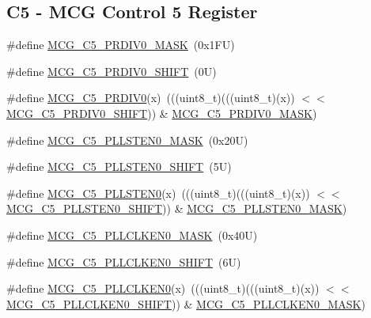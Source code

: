 \subsection*{C5 -\/ M\+CG Control 5 Register}
\begin{DoxyCompactItemize}
\item 
\#define \mbox{\hyperlink{group___m_c_g___register___masks_ga28ab0b9007f9941707395660db088172}{M\+C\+G\+\_\+\+C5\+\_\+\+P\+R\+D\+I\+V0\+\_\+\+M\+A\+SK}}~(0x1\+F\+U)
\item 
\#define \mbox{\hyperlink{group___m_c_g___register___masks_ga452026beec3bec5a580d151e15d83f30}{M\+C\+G\+\_\+\+C5\+\_\+\+P\+R\+D\+I\+V0\+\_\+\+S\+H\+I\+FT}}~(0\+U)
\item 
\#define \mbox{\hyperlink{group___m_c_g___register___masks_gaff29a787086eaba9ef46f4e873d83a54}{M\+C\+G\+\_\+\+C5\+\_\+\+P\+R\+D\+I\+V0}}(x)~(((uint8\+\_\+t)(((uint8\+\_\+t)(x)) $<$$<$ \mbox{\hyperlink{group___m_c_g___register___masks_ga452026beec3bec5a580d151e15d83f30}{M\+C\+G\+\_\+\+C5\+\_\+\+P\+R\+D\+I\+V0\+\_\+\+S\+H\+I\+FT}})) \& \mbox{\hyperlink{group___m_c_g___register___masks_ga28ab0b9007f9941707395660db088172}{M\+C\+G\+\_\+\+C5\+\_\+\+P\+R\+D\+I\+V0\+\_\+\+M\+A\+SK}})
\item 
\#define \mbox{\hyperlink{group___m_c_g___register___masks_ga9bec4ed23caf6a431b506e944d928080}{M\+C\+G\+\_\+\+C5\+\_\+\+P\+L\+L\+S\+T\+E\+N0\+\_\+\+M\+A\+SK}}~(0x20\+U)
\item 
\#define \mbox{\hyperlink{group___m_c_g___register___masks_ga486796db598fbf2f07f39d71453f49b6}{M\+C\+G\+\_\+\+C5\+\_\+\+P\+L\+L\+S\+T\+E\+N0\+\_\+\+S\+H\+I\+FT}}~(5\+U)
\item 
\#define \mbox{\hyperlink{group___m_c_g___register___masks_ga75551114843366d40dd54e1c05fd2002}{M\+C\+G\+\_\+\+C5\+\_\+\+P\+L\+L\+S\+T\+E\+N0}}(x)~(((uint8\+\_\+t)(((uint8\+\_\+t)(x)) $<$$<$ \mbox{\hyperlink{group___m_c_g___register___masks_ga486796db598fbf2f07f39d71453f49b6}{M\+C\+G\+\_\+\+C5\+\_\+\+P\+L\+L\+S\+T\+E\+N0\+\_\+\+S\+H\+I\+FT}})) \& \mbox{\hyperlink{group___m_c_g___register___masks_ga9bec4ed23caf6a431b506e944d928080}{M\+C\+G\+\_\+\+C5\+\_\+\+P\+L\+L\+S\+T\+E\+N0\+\_\+\+M\+A\+SK}})
\item 
\#define \mbox{\hyperlink{group___m_c_g___register___masks_ga73671453b8f8804784e5b7e67551726d}{M\+C\+G\+\_\+\+C5\+\_\+\+P\+L\+L\+C\+L\+K\+E\+N0\+\_\+\+M\+A\+SK}}~(0x40\+U)
\item 
\#define \mbox{\hyperlink{group___m_c_g___register___masks_gaa66ceed70e1055a31e46c60a502b8eb7}{M\+C\+G\+\_\+\+C5\+\_\+\+P\+L\+L\+C\+L\+K\+E\+N0\+\_\+\+S\+H\+I\+FT}}~(6\+U)
\item 
\#define \mbox{\hyperlink{group___m_c_g___register___masks_gac3faf5c909bfee8fa6b28d1c1e1face7}{M\+C\+G\+\_\+\+C5\+\_\+\+P\+L\+L\+C\+L\+K\+E\+N0}}(x)~(((uint8\+\_\+t)(((uint8\+\_\+t)(x)) $<$$<$ \mbox{\hyperlink{group___m_c_g___register___masks_gaa66ceed70e1055a31e46c60a502b8eb7}{M\+C\+G\+\_\+\+C5\+\_\+\+P\+L\+L\+C\+L\+K\+E\+N0\+\_\+\+S\+H\+I\+FT}})) \& \mbox{\hyperlink{group___m_c_g___register___masks_ga73671453b8f8804784e5b7e67551726d}{M\+C\+G\+\_\+\+C5\+\_\+\+P\+L\+L\+C\+L\+K\+E\+N0\+\_\+\+M\+A\+SK}})
\end{DoxyCompactItemize}
